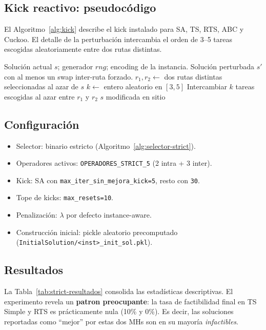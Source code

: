 \subsection{Kick reactivo: pseudocódigo}

El Algoritmo~\ref{alg:kick} describe el kick instalado para SA, TS,
RTS, ABC y Cuckoo. El detalle de la perturbación intercambia el orden
de 3--5 tareas escogidas aleatoriamente entre dos rutas distintas.

\begin{algorithm}[h]
\caption{Kick reactivo poblacional.}
\label{alg:kick}
\begin{algorithmic}[1]
\Require Solución actual $s$; generador $rng$; encoding de la instancia.
\Ensure Solución perturbada $s'$ con al menos un swap inter-ruta forzado.
\State $r_1, r_2 \gets$ dos rutas distintas seleccionadas al azar de $s$
\State $k \gets$ entero aleatorio en $[3, 5]$
\State Intercambiar $k$ tareas escogidas al azar entre $r_1$ y $r_2$
\State \Return $s$ modificada en sitio
\end{algorithmic}
\end{algorithm}

\subsection{Configuración}

\begin{itemize}
\item Selector: binario estricto (Algoritmo~\ref{alg:selector-strict}).
\item Operadores activos: \texttt{OPERADORES\_STRICT\_5}
  (2 intra + 3 inter).
\item Kick: SA con \texttt{max\_iter\_sin\_mejora\_kick=5},
  resto con \texttt{30}.
\item Tope de kicks: \texttt{max\_resets=10}.
\item Penalización: $\lambda$ por defecto instance-aware.
\item Construcción inicial: pickle aleatorio precomputado
  (\texttt{InitialSolution/<inst>\_init\_sol.pkl}).
\end{itemize}

\subsection{Resultados}

La Tabla~\ref{tab:strict-resultados} consolida las estadísticas
descriptivas. El experimento revela un \textbf{patron preocupante}: la
tasa de factibilidad final en TS Simple y RTS es prácticamente nula
(10\% y 0\%). Es decir, las soluciones reportadas como ``mejor'' por
estas dos MHs son en su mayoría \emph{infactibles}.

